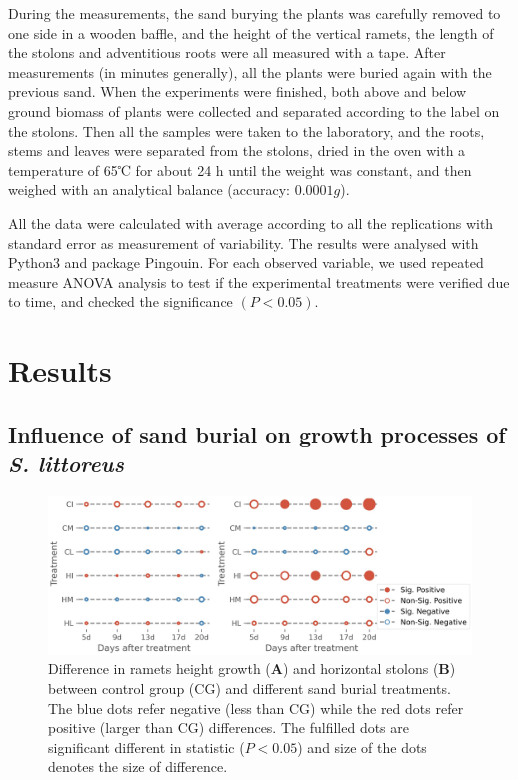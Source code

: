 \documentclass[]{interact}
\theoremstyle{plain}%
\theoremstyle{definition}
\theoremstyle{remark}
\begin{document}
During the measurements, the sand burying the plants was carefully removed to one side in a wooden baffle, and the height of the vertical ramets, the length of the stolons and adventitious roots were all measured with a tape. After measurements (in minutes generally), all the plants were buried again with the previous sand. When the experiments were finished, both above and below ground biomass of plants were collected and separated according to the label on the stolons. Then all the samples were taken to the laboratory, and the roots, stems and leaves were separated from the stolons, dried in the oven with a temperature of 65℃ for about 24 h until the weight was constant, and then weighed with an analytical balance (accuracy: $0.0001g$).

All the data were calculated with average according to all the replications with standard error as measurement of variability. The results were analysed with Python3 and package Pingouin. For each observed variable, we used repeated measure ANOVA analysis to test if the experimental treatments were verified due to time, and checked the significance $(P<0.05)$.

\section{Results}

\subsection{Influence of sand burial on growth processes of \textit{S. littoreus}}

\begin{figure}[!h]
  \centering
  \includegraphics[scale=0.8]{../figs/grid_differences.jpg}
  \caption{
    Difference in ramets height growth (\textbf{A}) and horizontal stolons (\textbf{B}) between control group (CG) and different sand burial treatments. The blue dots refer negative (less than CG) while the red dots refer positive (larger than CG) differences. The fulfilled dots are significant different in statistic ($P<0.05$) and size of the dots denotes the size of difference.  
  } 
  \label{fig:lattice}
\end{figure}
\end{document}
